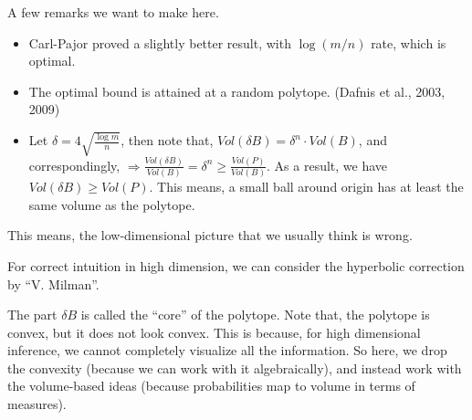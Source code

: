 \documentclass[12pt]{article}
\begin{document}
A few remarks we want to make here.
\begin{itemize}
    \item Carl-Pajor proved a slightly better result, with $\log(m/n)$ rate, which is optimal.
    \item The optimal bound is attained at a random polytope. (Dafnis et al., 2003, 2009)
    \item Let $\delta = 4\sqrt{\frac{\log m}{n}}$, then note that, $Vol(\delta B) = \delta^n \cdot Vol(B)$, and correspondingly, $\Rightarrow \frac{Vol(\delta B)}{Vol(B)} = \delta^n \geq \frac{Vol(P)}{Vol(B)}$. As a result, we have $Vol(\delta B) \geq Vol(P)$. This means, a small ball around origin has at least the same volume as the polytope.
\end{itemize}

This means, the low-dimensional picture that we usually think is wrong.


\noindent For correct intuition in high dimension, we can consider the hyperbolic correction by ``V. Milman''.


\noindent The part $\delta B$ is called the ``core'' of the polytope. Note that, the polytope is convex, but it does not look convex. This is because, for high dimensional inference, we cannot completely visualize all the information. So here, we drop the convexity (because we can work with it algebraically), and instead work with the volume-based ideas (because probabilities map to volume in terms of measures).
\end{document}
